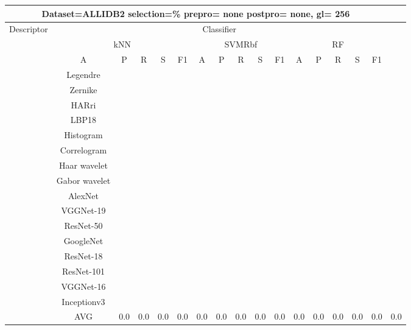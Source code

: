 \documentclass[12pt,italian]{article}
\begin{document}
\begin{tiny}
 \pagebreak 
\begin{longtable}{lcccccccccccccccc}
\toprule
\multicolumn{16}{c}{Dataset=ALLIDB2 selection=\% prepro= none postpro= none, gl= 256} \\ 
\toprule
Descriptor & \multicolumn{15}{c}{Classifier} \\ 
& \multicolumn{5}{c}{kNN} & \multicolumn{5}{c}{SVMRbf} & \multicolumn{5}{c}{RF} \\ 
& A & P & R & S & F1 & A & P & R & S & F1 & A & P & R & S & F1 \\ 
\midrule
& Legendre \\ 
& Zernike \\ 
& HARri \\ 
& LBP18 \\ 
& Histogram \\ 
& Correlogram \\ 
& Haar wavelet \\ 
& Gabor wavelet \\ 
& AlexNet \\ 
& VGGNet-19 \\ 
& ResNet-50 \\ 
& GoogleNet \\ 
& ResNet-18 \\ 
& ResNet-101 \\ 
& VGGNet-16 \\ 
& Inceptionv3 \\ 
\hline
& AVG &  0.0 &  0.0 &  0.0 &  0.0 &  0.0 &  0.0 &  0.0 &  0.0 &  0.0 &  0.0 &  0.0 &  0.0 &  0.0 &  0.0 &  0.0 \\ 
\hline
\bottomrule
\end{longtable} 

 \pagebreak 
\end{tiny} 
 
\end{document}
